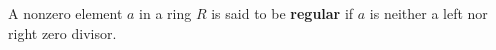 A nonzero element $a$ in a ring $R$ is said to be \textbf{regular} if $a$ is neither a left nor right zero divisor.
